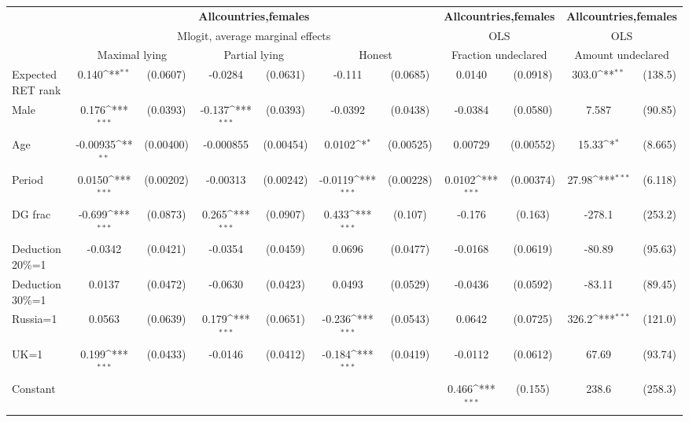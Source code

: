 \def\sym#1{\ifmmode^{#1}\else\(^{#1}\)\fi}
\begin{tabular}{l|cccccc|cc|cc}
\hline\hline
&\multicolumn{6}{c|}{\bf All\space{}countries,\space{}females}&\multicolumn{2}{c|}{\bf All\space{}countries,\space{}females}&\multicolumn{2}{c}{\bf All\space{}countries,\space{}females}\\ &\multicolumn{6}{c|}{Mlogit, average marginal effects }&\multicolumn{2}{c|}{OLS}&\multicolumn{2}{c}{OLS}\\
                &\multicolumn{2}{c}{Maximal lying}&\multicolumn{2}{c}{Partial lying}&\multicolumn{2}{c}{Honest}  &\multicolumn{2}{c}{Fraction undeclared}&\multicolumn{2}{c}{Amount undeclared}\\
\hline
Expected RET rank&    0.140\sym{**} & (0.0607)&  -0.0284         & (0.0631)&   -0.111         & (0.0685)&   0.0140         & (0.0918)&    303.0\sym{**} &  (138.5)\\
Male            &    0.176\sym{***}& (0.0393)&   -0.137\sym{***}& (0.0393)&  -0.0392         & (0.0438)&  -0.0384         & (0.0580)&    7.587         &  (90.85)\\
Age             & -0.00935\sym{**} &(0.00400)&-0.000855         &(0.00454)&   0.0102\sym{*}  &(0.00525)&  0.00729         &(0.00552)&    15.33\sym{*}  &  (8.665)\\
Period          &   0.0150\sym{***}&(0.00202)& -0.00313         &(0.00242)&  -0.0119\sym{***}&(0.00228)&   0.0102\sym{***}&(0.00374)&    27.98\sym{***}&  (6.118)\\
DG frac         &   -0.699\sym{***}& (0.0873)&    0.265\sym{***}& (0.0907)&    0.433\sym{***}&  (0.107)&   -0.176         &  (0.163)&   -278.1         &  (253.2)\\
Deduction 20\%=1&  -0.0342         & (0.0421)&  -0.0354         & (0.0459)&   0.0696         & (0.0477)&  -0.0168         & (0.0619)&   -80.89         &  (95.63)\\
Deduction 30\%=1&   0.0137         & (0.0472)&  -0.0630         & (0.0423)&   0.0493         & (0.0529)&  -0.0436         & (0.0592)&   -83.11         &  (89.45)\\
Russia=1        &   0.0563         & (0.0639)&    0.179\sym{***}& (0.0651)&   -0.236\sym{***}& (0.0543)&   0.0642         & (0.0725)&    326.2\sym{***}&  (121.0)\\
UK=1            &    0.199\sym{***}& (0.0433)&  -0.0146         & (0.0412)&   -0.184\sym{***}& (0.0419)&  -0.0112         & (0.0612)&    67.69         &  (93.74)\\
Constant        &                  &         &                  &         &                  &         &    0.466\sym{***}&  (0.155)&    238.6         &  (258.3)\\

\end{tabular}

